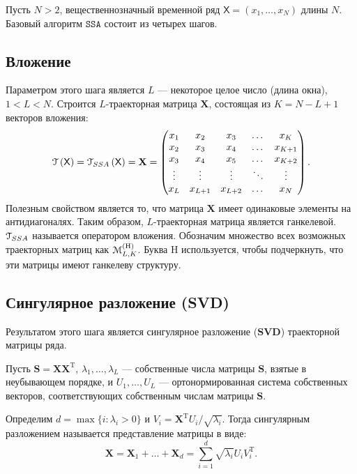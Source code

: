 \documentclass[12pt, specialist, subf
]{disser}
\theoremstyle{definition}
\newcommand{\SSA}{\texttt{SSA}}
\newcommand{\TS}{\mathsf{X}}
\newcommand{\MH}{\EuScript{M}_{L,K}^{(\mathrm{H})}}
\begin{document}
Пусть $N > 2$, вещественнозначный временной ряд
$\TS = (x_1, \dots, x_{N})$ длины $N$.
Базовый алгоритм $\SSA$ состоит из четырех шагов.

\subsection*{Вложение}
Параметром этого шага является $L$ --- некоторое целое число (длина окна), $1 < L < N$. Строится $L$-траекторная матрица $\mathbf{X}$, состоящая из $K = N - L + 1$ векторов вложения:
\begin{equation}
	\label{eq:X}
	\EuScript{T} \left(\TS \right) = \EuScript{T}_{SSA} \left(\TS \right)=
	\mathbf{X} =
	\begin{pmatrix}
		x_1    & x_2     & x_3     & \dots  & x_{K}   \\
		x_2    & x_3     & x_4     & \dots  & x_{K+1} \\
		x_3    & x_4     & x_5     & \dots  & x_{K+2} \\
		\vdots & \vdots  & \vdots  & \ddots & \vdots  \\
		x_{L}  & x_{L+1} & x_{L+2} & \dots  & x_{N}
	\end{pmatrix}.
\end{equation}
Полезным свойством является то, что матрица $\mathbf{X}$ имеет одинаковые элементы на антидиагоналях. Таким образом, $L$-траекторная матрица является ганкелевой. $\EuScript{T}_{SSA}$ называется оператором вложения. Обозначим множество всех возможных траекторных матриц как \( \MH \). Буква \( \mathrm{H} \) используется, чтобы подчеркнуть, что эти матрицы имеют ганкелеву структуру.

\subsection*{Сингулярное разложение (SVD)}
Результатом этого шага является сингулярное разложение ($\mathbf{SVD}$) траекторной матрицы ряда.

Пусть $\mathbf{S} = \mathbf{X}\mathbf{X}^{\mathrm{T}}$,
$\lambda_1, \dots, \lambda_L$ --- собственные числа матрицы $\mathbf{S}$, взятые в неубывающем порядке, и
$U_1, \dots, U_L$ --- ортонормированная система собственных векторов, соответствующих собственным числам матрицы $\mathbf S$.

Определим $d = \max{ \{i: \lambda_i > 0 \}}$ и
$V_i = \mathbf{X}^{\mathrm{T}} U_i / \sqrt{\lambda_i}$.
Тогда сингулярным разложением называется представление матрицы в виде:
\begin{equation}
	\mathbf{X} = \mathbf{X}_1 + \dots + \mathbf{X}_d =
	\sum_{i = 1}^{d} \sqrt{\lambda_i} U_i V_{i}^{\mathrm{T}}\label{eq:1}.
\end{equation}
\end{document}
